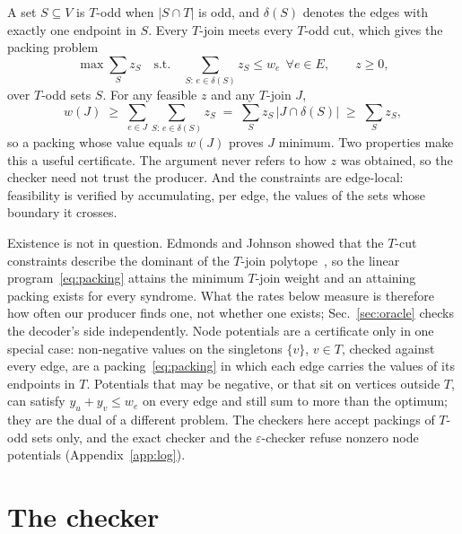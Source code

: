 \documentclass[aps,pra,twocolumn,superscriptaddress,nofootinbib,longbibliography,floatfix]{revtex4-2}
\newcommand{\eps}{\varepsilon}
\newcommand{\T}{T}
\newcommand{\delt}{\delta}
\begin{document}
A set $S\subseteq V$ is $\T$-odd when $|S\cap\T|$ is odd, and $\delt(S)$ denotes the edges with exactly one endpoint in $S$. Every $\T$-join meets every $\T$-odd cut, which gives the packing problem
\begin{equation}
\max \sum_S z_S \quad\text{s.t.}\quad \sum_{S:\,e\in\delt(S)} z_S \le w_e\ \ \forall e\in E,\qquad z\ge 0,
\label{eq:packing}
\end{equation}
over $\T$-odd sets $S$. For any feasible $z$ and any $\T$-join $J$,
\begin{equation}
w(J) \;\ge\; \sum_{e\in J}\sum_{S:\,e\in\delt(S)} z_S \;=\; \sum_S z_S\,|J\cap\delt(S)| \;\ge\; \sum_S z_S ,
\label{eq:weakduality}
\end{equation}
so a packing whose value equals $w(J)$ proves $J$ minimum. Two properties make this a useful certificate. The argument never refers to how $z$ was obtained, so the checker need not trust the producer. And the constraints are edge-local: feasibility is verified by accumulating, per edge, the values of the sets whose boundary it crosses.

Existence is not in question. Edmonds and Johnson showed that the $\T$-cut constraints describe the dominant of the $\T$-join polytope~\cite{edmondsjohnson1973}, so the linear program~\eqref{eq:packing} attains the minimum $\T$-join weight and an attaining packing exists for every syndrome. What the rates below measure is therefore how often our producer finds one, not whether one exists; Sec.~\ref{sec:oracle} checks the decoder's side independently. Node potentials are a certificate only in one special case: non-negative values on the singletons $\{v\}$, $v\in\T$, checked against every edge, are a packing~\eqref{eq:packing} in which each edge carries the values of its endpoints in $\T$. Potentials that may be negative, or that sit on vertices outside $\T$, can satisfy $y_u+y_v\le w_e$ on every edge and still sum to more than the optimum; they are the dual of a different problem. The checkers here accept packings of $\T$-odd sets only, and the exact checker and the $\eps$-checker refuse nonzero node potentials (Appendix~\ref{app:log}).

\section{The checker}
\label{sec:checker}
\end{document}
